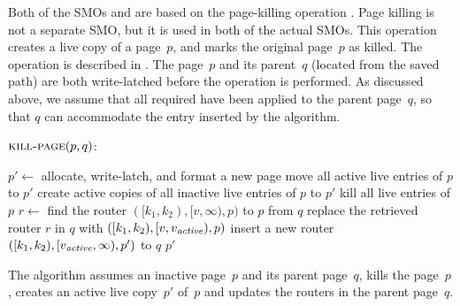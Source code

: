 Both of the SMOs  and  are based on the
page-killing operation .
Page killing is not a separate SMO, but it is used in both of the actual
SMOs.
This operation creates a live copy of a page~$p$, and marks the original
page~$p$ as killed.
The operation is described in .
The page~$p$ and its parent~$q$ (located from the saved path) are both
write-latched before the operation is performed.
As discussed above, we assume that all required  have been
applied to the parent page~$q$, so that $q$ can accommodate the entry
inserted by the algorithm.

\begin{algorithm}
$\proc{kill-page}(p, q)$:

\begin{algorithmic}[1]
\STATE $p' \leftarrow$ allocate, write-latch, and format a new page
\STATE move all active live entries of $p$ to $p'$
\STATE create active copies of all inactive live entries of $p$ to $p'$
\STATE kill all live entries of $p$ 
\STATE $r \leftarrow$ find the router $([k_1, k_2), [v,\infty), p)$ to $p$
from $q$ 
\STATE replace the retrieved router $r$ in $q$ with $([k_1,k_2),
[v,\smash{v_{\text{\textit{active}}}}), p)$
\STATE insert a new router $([k_1, k_2), [\smash{v_{\text{\textit{active}}}},\infty), p')$ to
$q$
\RETURN $p'$
\end{algorithmic}
%
{The algorithm assumes an inactive page~$p$ and its parent page~$q$, kills
the page~$p$, creates an active live copy~$p'$ of~$p$ and updates the
routers in the parent page~$q$.}
\label{alg:killpage}
\end{algorithm}

